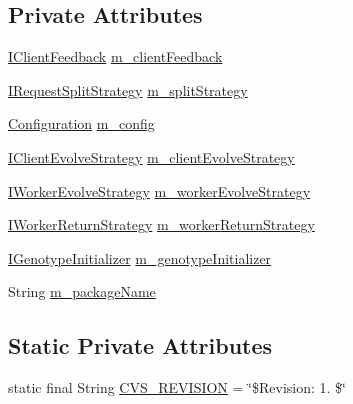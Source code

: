 \subsection*{Private Attributes}
\begin{DoxyCompactItemize}
\item 
\hyperlink{interfaceorg_1_1jgap_1_1distr_1_1grid_1_1_i_client_feedback}{I\-Client\-Feedback} \hyperlink{classorg_1_1jgap_1_1distr_1_1grid_1_1_grid_configuration_base_a51fd3827dc91a34a92488f766dbf5bba}{m\-\_\-client\-Feedback}
\item 
\hyperlink{interfaceorg_1_1jgap_1_1distr_1_1grid_1_1_i_request_split_strategy}{I\-Request\-Split\-Strategy} \hyperlink{classorg_1_1jgap_1_1distr_1_1grid_1_1_grid_configuration_base_a93f9ffd151b6d4ec26bc14b02a5c73af}{m\-\_\-split\-Strategy}
\item 
\hyperlink{classorg_1_1jgap_1_1_configuration}{Configuration} \hyperlink{classorg_1_1jgap_1_1distr_1_1grid_1_1_grid_configuration_base_ab5b34ed9271831de47eaaf54d244716a}{m\-\_\-config}
\item 
\hyperlink{interfaceorg_1_1jgap_1_1distr_1_1grid_1_1_i_client_evolve_strategy}{I\-Client\-Evolve\-Strategy} \hyperlink{classorg_1_1jgap_1_1distr_1_1grid_1_1_grid_configuration_base_abc9fe0279c66b82f247fd551ea043e33}{m\-\_\-client\-Evolve\-Strategy}
\item 
\hyperlink{interfaceorg_1_1jgap_1_1distr_1_1grid_1_1_i_worker_evolve_strategy}{I\-Worker\-Evolve\-Strategy} \hyperlink{classorg_1_1jgap_1_1distr_1_1grid_1_1_grid_configuration_base_a339cceb4d7df014677a8780e81b3428e}{m\-\_\-worker\-Evolve\-Strategy}
\item 
\hyperlink{interfaceorg_1_1jgap_1_1distr_1_1grid_1_1_i_worker_return_strategy}{I\-Worker\-Return\-Strategy} \hyperlink{classorg_1_1jgap_1_1distr_1_1grid_1_1_grid_configuration_base_aa5e69435385d2d6922c5dc43283f776e}{m\-\_\-worker\-Return\-Strategy}
\item 
\hyperlink{interfaceorg_1_1jgap_1_1distr_1_1grid_1_1_i_genotype_initializer}{I\-Genotype\-Initializer} \hyperlink{classorg_1_1jgap_1_1distr_1_1grid_1_1_grid_configuration_base_a66bacb4d0aa95c298632f9115acdedae}{m\-\_\-genotype\-Initializer}
\item 
String \hyperlink{classorg_1_1jgap_1_1distr_1_1grid_1_1_grid_configuration_base_aa945d00497aaa8539b77d8f399b83120}{m\-\_\-package\-Name}
\end{DoxyCompactItemize}
\subsection*{Static Private Attributes}
\begin{DoxyCompactItemize}
\item 
static final String \hyperlink{classorg_1_1jgap_1_1distr_1_1grid_1_1_grid_configuration_base_ab1aca63601396e6a62f315b8b2f4d521}{C\-V\-S\-\_\-\-R\-E\-V\-I\-S\-I\-O\-N} = \char`\"{}\$Revision\-: 1. \$\char`\"{}
\end{DoxyCompactItemize}
